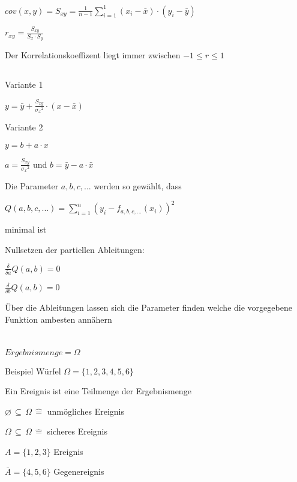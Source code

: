 \documentclass[10pt,a4paper,landscape]{article}
\begin{document}
\begin{multicols*}{4}
\noindent{}
\parbox{\columnwidth}{\centering$cov(x,y) = S_{xy} = \frac{1}{n-1}\sum \limits_{i=1}^1(x_i-\bar{x})\cdot(y_i-\bar{y})$}

\noindent{}
\parbox{\columnwidth}{\centering$r_{xy} = \frac{S_{xy}}{S_x \cdot S_y}$}
Der Korrelationskoeffizent liegt immer zwischen $-1 \leq r \leq 1$

\subsection{\noindent{}}

\noindent{}
\parbox{\columnwidth}{\centering Variante 1}
\parbox{\columnwidth}{\centering$y = \bar{y} + \frac{S_{xy}}{{\sigma_x}^2} \cdot (x-\bar{x})$}
\parbox{\columnwidth}{\centering Variante 2}
\parbox{\columnwidth}{\centering$y = b + a \cdot x$}
\parbox{\columnwidth}{\centering$a = \frac{S_{xy}}{{\sigma_x}^2}$ und $b = \bar{y} - a \cdot \bar{x}$}

\noindent{}
\parbox{\columnwidth}{\centering Die Parameter $a, b, c, ...$ werden so gewählt, dass}
\parbox{\columnwidth}{\centering $Q(a,b,c,...) = \sum \limits_{i=1}^n (y_i - f_{a,b,c,...}(x_i))^2$}
\parbox{\columnwidth}{\centering minimal ist}
\parbox{\columnwidth}{\centering Nullsetzen der partiellen Ableitungen:}
\parbox{\columnwidth}{\centering $\frac{\delta}{\delta a} Q(a,b) = 0 $}
\parbox{\columnwidth}{\centering $\frac{\delta}{\delta b} Q(a,b) = 0 $}
\parbox{\columnwidth}{\centering Über die Ableitungen lassen sich die Parameter finden welche die vorgegebene Funktion ambesten annähern}

\section{\noindent{}}
\subsection{\noindent{}}

\noindent{}
\parbox{\columnwidth}{\centering$Ergebnismenge = \Omega$}
\parbox{\columnwidth}{\centering Beispiel Würfel $\Omega = \{ 1, 2, 3, 4, 5, 6 \}$}
\parbox{\columnwidth}{\centering Ein Ereignis ist eine Teilmenge der Ergebnismenge}
\parbox{\columnwidth}{\centering$\varnothing \, \subseteq \, \Omega \, \widehat{=}$ unmögliches Ereignis}
\parbox{\columnwidth}{\centering$\Omega \, \subseteq \, \Omega \, \widehat{=}$ sicheres Ereignis}
\parbox{\columnwidth}{\centering$A = \{1, 2, 3 \}$ Ereignis}
\parbox{\columnwidth}{\centering$\bar{A} = \{4, 5, 6 \}$ Gegenereignis}


\end{multicols*}
\end{document}
